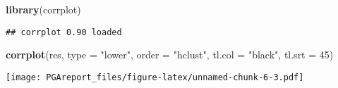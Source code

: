 \documentclass[
]{article}
\newenvironment{Shaded}{\begin{snugshade}}{\end{snugshade}}
\newcommand{\DataTypeTok}[1]{\textcolor[rgb]{0.13,0.29,0.53}{#1}}
\newcommand{\DecValTok}[1]{\textcolor[rgb]{0.00,0.00,0.81}{#1}}
\newcommand{\KeywordTok}[1]{\textcolor[rgb]{0.13,0.29,0.53}{\textbf{#1}}}
\newcommand{\NormalTok}[1]{#1}
\newcommand{\StringTok}[1]{\textcolor[rgb]{0.31,0.60,0.02}{#1}}
\begin{document}
\begin{Shaded}
\begin{Highlighting}[]
\KeywordTok{library}\NormalTok{(corrplot)}
\end{Highlighting}
\end{Shaded}

\begin{verbatim}
## corrplot 0.90 loaded
\end{verbatim}

\begin{Shaded}
\begin{Highlighting}[]
\KeywordTok{corrplot}\NormalTok{(res, }\DataTypeTok{type =} \StringTok{"lower"}\NormalTok{, }\DataTypeTok{order =} \StringTok{"hclust"}\NormalTok{, }
         \DataTypeTok{tl.col =} \StringTok{"black"}\NormalTok{, }\DataTypeTok{tl.srt =} \DecValTok{45}\NormalTok{)}
\end{Highlighting}
\end{Shaded}

\texttt{[image: PGAreport\_files/figure-latex/unnamed-chunk-6-3.pdf]}
\end{document}
